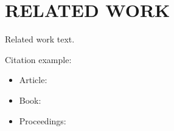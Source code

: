 \section{\uppercase{Related Work}}\label{sec:related-work}

\noindent Related work text.


Citation example:

\begin{itemize}
	\item Article: \cite{ArticleAuthorYear}
	\item Book: \cite{BookAuthorYear}
	\item Proceedings: \cite{ProceedingsAuthorYear}
\end{itemize}
